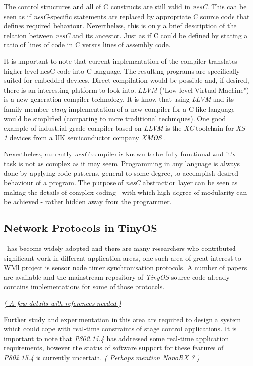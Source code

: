   The control structures and all of C constructs are still valid in
 \emph{nesC}. This can be seen as if \emph{nesC}-specific statements
 are replaced by appropriate C source code that defines required behaviour.
 Nevertheless, this is only a brief description of the relation between
 \emph{nesC} and its ancestor. Just as if C could be defined by stating
 a ratio of lines of code in C versus lines of assembly code.

 It is important to note that current implementation of the compiler
 translates higher-level nesC code into C language. The resulting
 programs are specifically suited for embedded devices. Direct
 compilation would be possible and, if desired, there is an interesting
 platform to look into. \emph{LLVM} ("Low-level Virtual Machine") is a
 new generation compiler technology. It is know that using \emph{LLVM}
 and its family member \emph{clang} implementation of a new compiler
 for a C-like language would be simplified (comparing to more traditional
 techniques). One good example of industrial grade compiler based on
 \emph{LLVM} is the \emph{XC} toolchain for \emph{XS-1} devices from
 a UK semiconductor company \emph{XMOS} \cite{paper:xmos:docs:xcc}.

 Nevertheless, currently \emph{nesC} compiler is known to be fully
 functional and it's task is not as complex as it may seem. Programming
 in any language is always done by applying code patterns, general
 to some degree, to accomplish desired behaviour of a program.
 The purpose of \emph{nesC} abstraction layer can be seen as making
 the details of complex coding - with which high degree of modularity
 can be achieved - rather hidden away from the programmer.


\subsection{Network Protocols in TinyOS}
 
  \TinyOS\ has become widely adopted and there are many researchers
 who contributed significant work in different application areas, one
 such area of great interest to WMI project is sensor node timer
 synchronisation protocols. A number of papers are available and the
 mainstream repository of \emph{TinyOS} source code already contains
 implementations for some of those protocols.

 \underline{\emph{( A few details with references needed )}}

  Further study and experimentation in this area are required to design
 a system which could cope with real-time constraints of stage control
 applications. It is important to note that \emph{P802.15.4} has addressed
 some real-time application requirements, however the status of software
 support for these features of \emph{P802.15.4} is currently uncertain.
 \underline{\emph{( Perhaps mention NanoRX ? )}}

